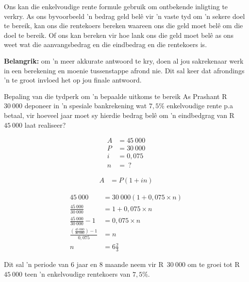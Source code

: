 Ons kan die enkelvoudige rente formule gebruik om ontbekende inligting te verkry. As ons byvoorbeeld 'n bedrag geld bel\^{e} vir 'n vaste tyd om 'n sekere doel te bereik, kan ons die rentekoers bereken waareen ons die geld moet bel\^{e} om die doel te bereik. Of ons kan bereken vir hoe lank ons die geld moet bel\^{e} as ons weet wat die aanvangsbedrag en die eindbedrag en die rentekoers is. 

\par
\textbf{Belangrik:} om 'n meer akkurate antwoord te kry, doen al jou sakrekenaar werk in een berekening en moenie tussenstappe afrond nie. Dit sal keer dat afrondings 'n te groot invloed het op jou finale antwoord.


\begin{wex}{Bepaling van die tydperk om 'n bepaalde uitkoms te bereik}
{As Prashant  R~$30~000$ deponeer in ’n spesiale
bankrekening wat $7,5\%$ enkelvoudige rente p.a betaal, vir hoeveel jaar moet
sy hierdie bedrag belê om 'n eindbedgrag van R~$45~000$ laat realiseer?}
{
    \begin{align*}
	A &= 45~000\\
	P &= 30~000\\
	i &= 0,075\\
	n &= ~?
    \end{align*}

    \begin{align*}
	A &= P(1 + in)
    \end{align*}

    \begin{align*}
	45~000 &= 30~000(1 + 0,075 \times n)\\
	\frac{45~000}{30~000} &= 1 + 0,075 \times n \\ 
	\frac{45~000}{30~000} -1 &= 0,075 \times n \\
	\frac{(\frac{45~000}{30~000}) -1}{0,075} &= n \\
	n &= 6\frac{2}{3}
    \end{align*}

    Dit sal ’n periode van 6 jaar en 8 maande neem vir R~$30~000$ om te groei tot R~$45~000$ teen ’n enkelvoudige rentekoers van $7,5\%$.
    }
\end{wex}
\vspace{-25pt}



